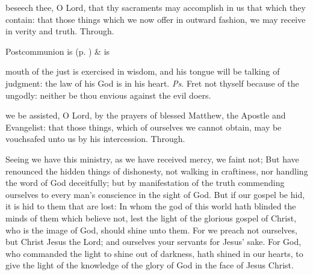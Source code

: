 \postcommunion
{} beseech thee, O Lord, that thy sacraments may accomplish in us that which they contain: that those things which we now offer in outward fashion, we may receive in verity and truth. Through.
\begin{rubric}
     Postcommunion is  (p. \pageref{SPSaints}) \&  is 
\end{rubric}



\introit
{} mouth of the just is exercised in wisdom, and his tongue will be talking of judgment: the law of his God is in his heart. \textit{Ps.} Fret not thyself because of the ungodly: neither be thou envious against the evil doers.

\collect
{} we be assisted, O Lord, by the prayers of blessed Matthew, the Apostle and Evangelist: that those things, which of ourselves we cannot obtain, may be vouchsafed unto us by his intercession. Through.

 Seeing we have this ministry, as we have received mercy, we faint not; But have renounced the hidden things of dishonesty, not walking in craftiness, nor handling the word of God deceitfully; but by manifestation of the truth commending ourselves to every man's conscience in the sight of God. But if our gospel be hid, it is hid to them that are lost: In whom the god of this world hath blinded the minds of them which believe not, lest the light of the glorious gospel of Christ, who is the image of God, should shine unto them. For we preach not ourselves, but Christ Jesus the Lord; and ourselves your servants for Jesus' sake. For God, who commanded the light to shine out of darkness, hath shined in our hearts, to give the light of the knowledge of the glory of God in the face of Jesus Christ.

